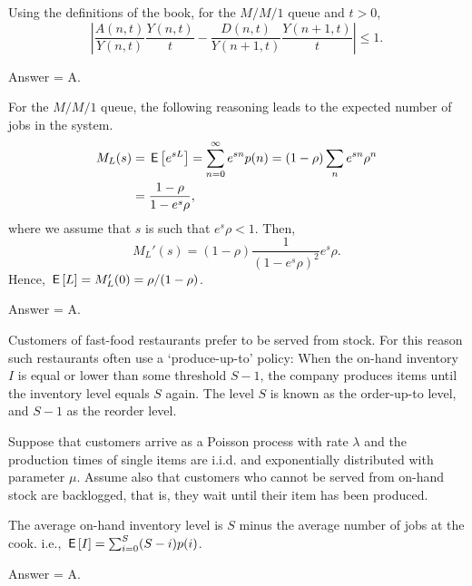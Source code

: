 \begin{exercise}[201803]
Using the definitions of the book, for the $M/M/1$ queue and $t>0$, 
\begin{equation*}
\left|  \frac{A(n,t)}{Y(n,t)}\frac{Y(n,t)}t - \frac{D(n,t)}{Y(n+1,t)}\frac{Y(n+1,t)}t \right| \leq 1. 
\end{equation*}
\begin{solution}
Answer = A.
\end{solution}
\end{exercise}

\begin{exercise}[201803]
For the $M/M/1$ queue, the following reasoning leads to the expected number of jobs in the system.
\begin{equation*}
  \begin{split}
  M_L(s) 
&= \,\mathsf{E}\left[e^{s L}\right] = \sum_{n=0}^\infty e^{s n}p(n) = (1-\rho) \sum_n e^{s n} \rho^n \\
&=\frac{1-\rho}{1-e^{s}\rho},
  \end{split}
\end{equation*}
where we assume that $s$ is such that $e^s \rho < 1$. Then, 
\begin{equation*}
  M_L'(s) = (1-\rho) \frac{1}{(1-e^s\rho)^2} e^s \rho.
\end{equation*}
Hence, $\,\mathsf{E}\left[L\right] = M_L'(0) = \rho/(1-\rho)$.
\begin{solution}
Answer = A.
\end{solution}
\end{exercise}

\begin{exercise}[201803]
Customers of fast-food restaurants prefer to be served from stock. For this reason such
restaurants often use a `produce-up-to' policy: When the on-hand inventory $I$ is equal or lower than some threshold $S-1$, the company produces items until the inventory level equals $S$ again. The level $S$ is known as the order-up-to level, and $S-1$ as the reorder level.

Suppose that customers arrive as a Poisson process with rate $\lambda$
and the production times of single items are i.i.d. and exponentially
distributed with parameter $\mu$. Assume also that customers who
cannot be served from on-hand stock are backlogged, that is, they wait
until their item has been produced. 

The average on-hand inventory level is $S$ minus the average number of jobs at the cook. i.e., $\,\mathsf{E}\left[I\right] = \sum_{i=0}^{S} (S-i) p(i)$. 
\begin{solution}
Answer = A.
\end{solution}
\end{exercise}

